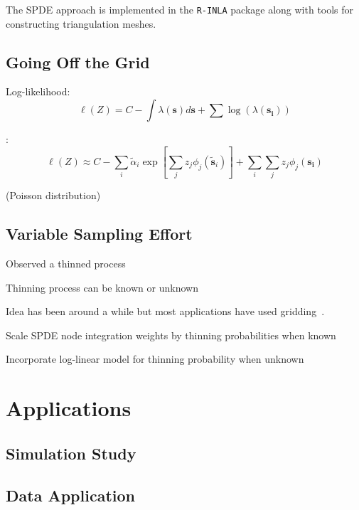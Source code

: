 \documentclass[]{interact}
\begin{document}
The SPDE approach is implemented in the \texttt{R-INLA} package along with
tools for constructing triangulation meshes.


\subsection{Going Off the Grid}

Log-likelihood:
\begin{displaymath}
\ell(Z) = C - \int \lambda(\mathbf{s}) d\mathbf{s}
+ \sum \log\left(\lambda(\mathbf{s_{i}})\right)
\end{displaymath}

\cite{simpsonetal}:
$$\ell(Z) \approx C - \sum_{i} \tilde{\alpha}_{i} \exp\left[\sum_{j} z_{j}\phi_{j}(\tilde{\mathbf{s}}_{i})\right] + \sum_{i} \sum_{j} z_{j}\phi_{j}(\mathbf{s_{i}})$$

(Poisson distribution)


\subsection{Variable Sampling Effort}

Observed a thinned process

Thinning process can be known or unknown

Idea has been around a while but most applications have used
gridding~\cite{chakrabortyetal}.

Scale SPDE node integration weights by thinning probabilities when known

Incorporate log-linear model for thinning probability when unknown \cite{yuanetal}


\section{Applications}


\subsection{Simulation Study}


\subsection{Data Application}
\end{document}
